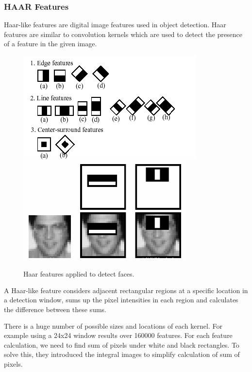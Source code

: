 \documentclass[a4paper,12pt]{report}
\begin{document}
\subsubsection{HAAR Features}
      Haar-like features are digital image features used in object detection\cite{viola_jones}. Haar features are similar to convolution 
      kernels which are used to detect the presence of a feature in the given image. 


      \begin{figure}[h]
	\centering
	\caption{\label{haar_feature} Haar features applied to detect faces\cite{opencv_website}.}
	\includegraphics[scale=0.62]{haar_features.png}
	\includegraphics[scale=0.62]{haar_applied.png}
      \end{figure}

      A Haar-like feature considers adjacent rectangular regions at a specific location in a detection window, sums up the pixel intensities in each region and calculates the difference between these sums. \cite{opencv_website}\par
      There is a huge number of possible sizes and locations of each kernel. For example using a 24x24 window results over 160000 features. For each feature calculation, we need to find sum of pixels under white and black rectangles. To solve this, they introduced the integral images to simplify calculation of sum of pixels\cite{sonia_pdf}.
\end{document}

